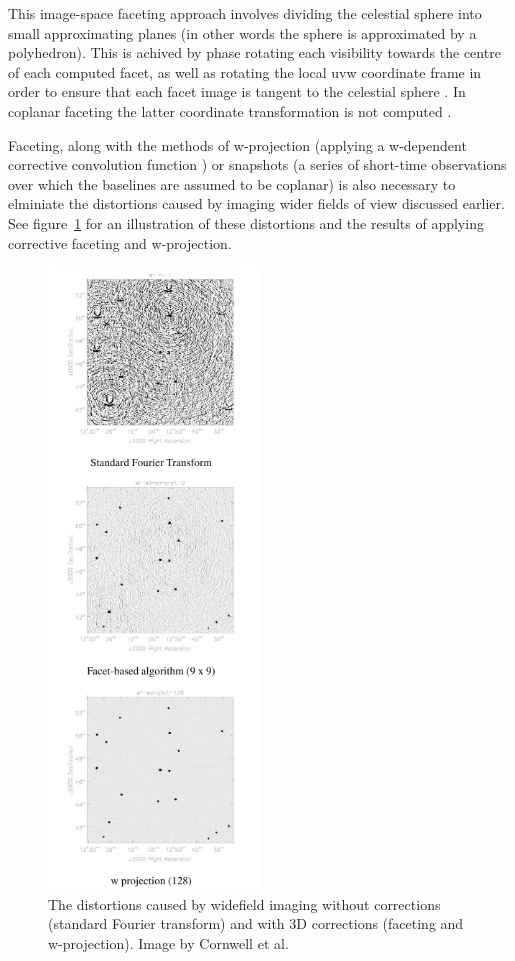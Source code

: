 \documentclass[a4paper, two column]{article}
\begin{document}
This image-space faceting approach involves dividing the celestial sphere into small approximating planes (in other words the sphere is approximated by a polyhedron). This is achived by phase rotating each visibility
towards the centre of each computed facet, as well as rotating the local uvw coordinate frame in order to ensure that each facet image is tangent to the celestial sphere \cite{cornwell1992radio}. In coplanar faceting
the latter coordinate transformation is not computed \cite{AIPS113}.

Faceting, along with the methods of w-projection (applying a w-dependent corrective convolution function \cite{cornwell2005w}) or snapshots (a series of short-time observations over which the baselines are assumed to be coplanar) is 
also necessary to elminiate the distortions caused by imaging wider fields of view discussed earlier. See figure~\ref{FIG_3D_DISTORTIONS} for an illustration of these distortions and the 
results of applying corrective faceting and w-projection.

\begin{figure}[h]
 \begin{mdframed}
 \centering
 \includegraphics[width=0.5\textwidth]{3d_correction.png}
 \caption{The distortions caused by widefield imaging without corrections (standard Fourier transform) and with 3D corrections (faceting and w-projection). Image by Cornwell et al. \cite{1416440}}
  \label{FIG_3D_DISTORTIONS}
 \end{mdframed}
\end{figure}
\end{document}
